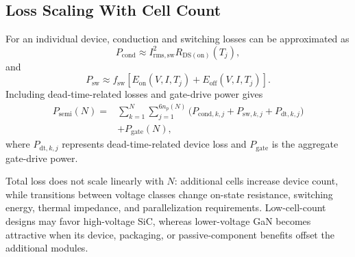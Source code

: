 \subsection{Loss Scaling With Cell Count}

For an individual device, conduction and switching losses can be
approximated as
\begin{equation}
P_{\mathrm{cond}}
\approx
I_{\mathrm{rms,sw}}^2
R_{\mathrm{DS(on)}}(T_j),
\label{eq:cond_loss_short}
\end{equation}
and
\begin{equation}
P_{\mathrm{sw}}
\approx
f_{\mathrm{sw}}
\left[
E_{\mathrm{on}}(V,I,T_j)
+
E_{\mathrm{off}}(V,I,T_j)
\right].
\label{eq:switching_loss_short}
\end{equation}
Including dead-time-related losses and gate-drive power gives
\begin{equation}
\begin{aligned}
P_{\mathrm{semi}}(N)
={}&\sum_{k=1}^{N}\sum_{j=1}^{6n_p(N)}
\bigl(P_{\mathrm{cond},k,j}+P_{\mathrm{sw},k,j}
+P_{\mathrm{dt},k,j}\bigr)\\
&+P_{\mathrm{gate}}(N),
\end{aligned}
\label{eq:complete_semiconductor_loss}
\end{equation}
where $P_{\mathrm{dt},k,j}$ represents dead-time-related device loss and
$P_{\mathrm{gate}}$ is the aggregate gate-drive power.

Total loss does not scale linearly with $N$: additional cells increase
device count, while transitions between voltage classes change on-state
resistance, switching energy, thermal impedance, and parallelization
requirements. Low-cell-count designs may favor high-voltage SiC,
whereas lower-voltage GaN becomes attractive when its device, packaging,
or passive-component benefits offset the additional modules.

